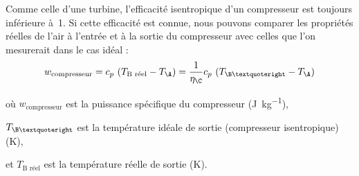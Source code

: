 		Comme celle d’une turbine, l’efficacité isentropique d’un compresseur est toujours inférieure à~1. Si cette efficacité est connue, nous pouvons comparer les propriétés réelles de l’air à l’entrée et à la sortie du compresseur avec celles que l’on mesurerait dans le cas idéal :
		\begin{equation}
			w_\text{compresseur} = c_p \ (T_\text{B réel} - T_\A) = \frac{1}{\eta_\C} c_p \ (T_{\B’} - T_\A)
			\label{eq_puissance_compresseur}
		\end{equation}
		\begin{equationterms}
			\item où \tab $w_\text{compresseur}$ 	\tab est la puissance spécifique du compresseur (\si{\joule\per\kilogram}),
			\item 	\tab $T_{\B’}$ 					\tab\tab\tab est la température idéale de sortie (compresseur isentropique) (\si{\kelvin}),
			\item et \tab $T_\text{B réel}$ 			\tab est la température réelle de sortie (\si{\kelvin}).
		\end{equationterms}

